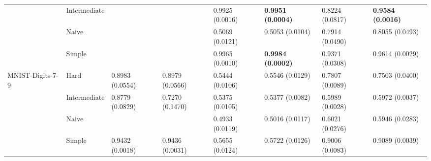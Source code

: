 \begin{tabular}{llllllll}
                 & Intermediate &                  &                           &           0.9925 (0.0016) &  \textbf{0.9951 (0.0004)} &           0.8224 (0.0817) &  \textbf{0.9584 (0.0016)} \\
                 & Naive &                  &                           &           0.5069 (0.0121) &           0.5053 (0.0104) &           0.7914 (0.0490) &           0.8055 (0.0493) \\
                 & Simple &                  &                           &           0.9965 (0.0010) &  \textbf{0.9984 (0.0002)} &           0.9371 (0.0308) &           0.9614 (0.0029) \\
MNIST-Digits-7-9 & Hard &  0.8983 (0.0554) &           0.8979 (0.0566) &           0.5444 (0.0106) &           0.5546 (0.0129) &           0.7807 (0.0089) &           0.7503 (0.0400) \\
                 & Intermediate &  0.8779 (0.0829) &           0.7270 (0.1470) &           0.5375 (0.0105) &           0.5377 (0.0082) &           0.5989 (0.0028) &           0.5972 (0.0037) \\
                 & Naive &                  &                           &           0.4933 (0.0119) &           0.5016 (0.0117) &           0.6021 (0.0276) &           0.5946 (0.0283) \\
                 & Simple &  0.9432 (0.0018) &           0.9436 (0.0031) &           0.5655 (0.0124) &           0.5722 (0.0126) &           0.9006 (0.0083) &           0.9089 (0.0039) \\
\bottomrule
\end{tabular}
